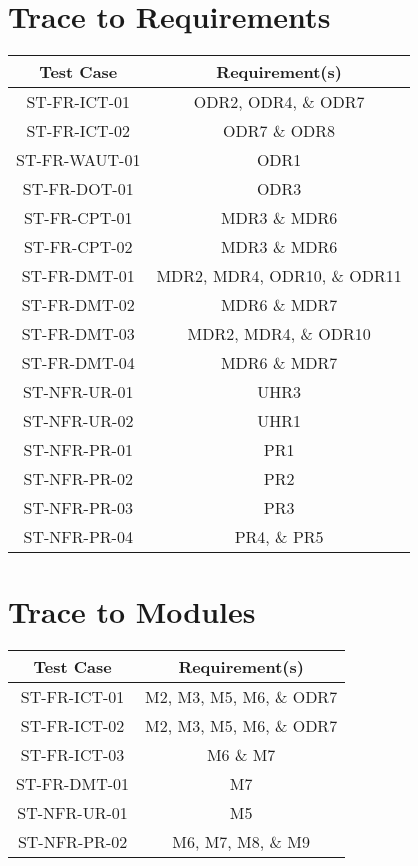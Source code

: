\documentclass[12pt, titlepage]{article}
\begin{document}
\section{Trace to Requirements}
\begin{center}
\begin{tabular}{||c c||} 
 \hline
 Test Case & Requirement(s)  \\ [0.5ex] 
 \hline\hline
 ST-FR-ICT-01 & ODR2, ODR4, \& ODR7 \\ 
 \hline
 ST-FR-ICT-02 & ODR7 \& ODR8 \\ 
 \hline
 ST-FR-WAUT-01 & ODR1\\ 
 \hline
 ST-FR-DOT-01 & ODR3 \\  
 \hline
 ST-FR-CPT-01 & MDR3 \& MDR6 \\ 
 \hline 
 ST-FR-CPT-02 & MDR3 \& MDR6 \\ 
 \hline
 ST-FR-DMT-01 & MDR2, MDR4, ODR10, \& ODR11 \\ 
 \hline
 ST-FR-DMT-02 & MDR6 \& MDR7 \\ 
 \hline
 ST-FR-DMT-03 & MDR2, MDR4, \& ODR10 \\ 
 \hline
 ST-FR-DMT-04 & MDR6 \& MDR7 \\ 
 \hline
 ST-NFR-UR-01 & UHR3  \\ 
 \hline
 ST-NFR-UR-02 & UHR1 \\
 \hline
 ST-NFR-PR-01 & PR1  \\
 \hline
 ST-NFR-PR-02 & PR2 \\
 \hline
 ST-NFR-PR-03 & PR3 \\ [1ex] 
 \hline
 ST-NFR-PR-04 & PR4, \& PR5 \\ [1ex] 
 \hline
\end{tabular}
\end{center}
		
\section{Trace to Modules}
\begin{center}
\begin{tabular}{||c c||} 
 \hline
 Test Case & Requirement(s)  \\ [0.5ex] 
 \hline\hline
 ST-FR-ICT-01 & M2, M3, M5, M6, \& ODR7 \\ 
 \hline
 ST-FR-ICT-02 & M2, M3, M5, M6, \& ODR7 \\ 
 \hline
 ST-FR-ICT-03 & M6 \& M7 \\ 
 \hline
 ST-FR-DMT-01 & M7 \\ 
 \hline
 ST-NFR-UR-01 & M5  \\ 
 \hline
 ST-NFR-PR-02 & M6, M7, M8, \& M9 \\
 \hline
\end{tabular}
\end{center}
\end{document}
